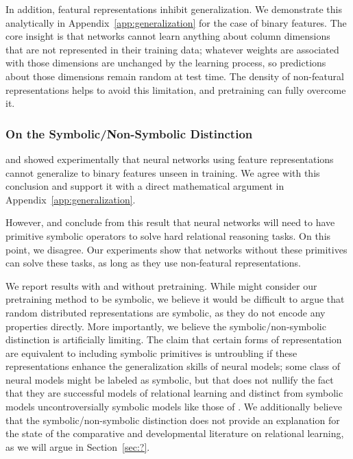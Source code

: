\documentclass{article}
\newcommand{\secref}[1]{Section~\ref{#1}}
\newcommand{\appref}[1]{Appendix~\ref{#1}}
\begin{document}
{In addition, featural representations inhibit generalization. We demonstrate this analytically in \appref{app:generalization} for the case of binary features. The core insight is that networks cannot learn anything about column dimensions that are not represented in their training data; whatever weights are associated with those dimensions are unchanged by the learning process, so predictions about those dimensions remain random at test time. The density of non-featural representations helps to avoid this limitation, and pretraining can fully overcome it.

\subsubsection{On the Symbolic/Non-Symbolic Distinction}

\citet{marcus:1999} and \citet{marcus:2001} showed experimentally that neural networks using feature representations cannot generalize to binary features unseen in training. We agree with this conclusion and support it with a direct mathematical argument in \appref{app:generalization}.

However, \citeauthor{marcus:1999} and \citeauthor{marcus:2001} conclude from this result that neural networks will need to have primitive symbolic operators to solve hard relational reasoning tasks. On this point, we disagree. Our experiments show that networks without these primitives can solve these tasks, as long as they use non-featural representations.

We report results with and without pretraining. While \citeauthor{marcus:2001} might consider our pretraining method to be symbolic, we believe it would be difficult to argue that random distributed representations are symbolic, as they do not encode any properties directly. More importantly, we believe the symbolic/non-symbolic distinction is artificially limiting. The claim that certain forms of representation are equivalent to including symbolic primitives is untroubling if these representations enhance the generalization skills of neural models; some class of neural models might be labeled as symbolic, but that does not nullify the fact that they are successful models of relational learning and distinct from symbolic models uncontroversially symbolic models like those of \citealt{frank:2011}. We additionally believe that the symbolic/non-symbolic distinction does not provide an explanation for the state of the comparative and developmental literature on relational learning, as we will argue in \secref{sec:?}.}
\end{document}
